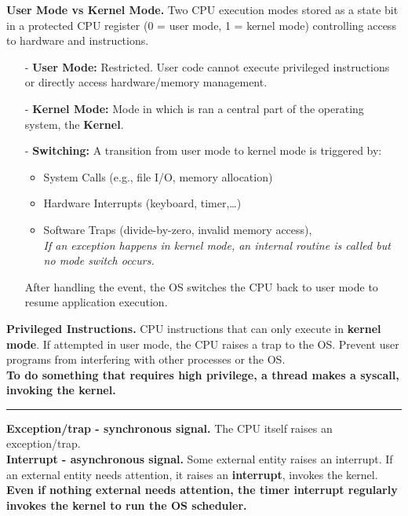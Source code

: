 \documentclass[8pt]{extarticle}
\begin{document}
\begin{minipage}[htp]{0.5\textwidth}
\begin{minipage}[htp]{1\textwidth}
\begin{itemize}[noitemsep,nolistsep,topsep=-10px,partopsep=0pt,parsep=0pt]
    \end{itemize}
    \vspace{15px}
    \noindent\textbf{User Mode vs Kernel Mode.} Two CPU execution modes stored as a state bit in a protected CPU register (0 = user mode, 1 = kernel mode) controlling access to hardware and instructions.
    \begin{itemize}[noitemsep,nolistsep,topsep=-10px,partopsep=0pt,parsep=0pt]
        \item[-] \textbf{User Mode:} Restricted. User code cannot execute privileged instructions or directly access hardware/memory management.
        \item[-] \textbf{Kernel Mode:} Mode in which is ran a central part of the operating system, the \textbf{Kernel}.
        \item[-] \textbf{Switching:} A transition from user mode to kernel mode is triggered by:
        \begin{itemize}[noitemsep,nolistsep]
            \item System Calls (e.g., file I/O, memory allocation)
            \item Hardware Interrupts (keyboard, timer,\dots)
            \item Software Traps (divide-by-zero, invalid memory access), \\
            \textit{If an exception happens in kernel mode, an internal routine is called but no mode switch occurs.}
        \end{itemize}
        After handling the event, the OS switches the CPU back to user mode to resume application execution.
    \end{itemize}\vspace{15px}
    \noindent\textbf{Privileged Instructions.} CPU instructions that can only execute in \textbf{kernel mode}. If attempted in user mode, the CPU raises a trap to the OS. Prevent user programs from interfering with other processes or the OS.\\
    \textbf{To do something that requires high privilege, a thread makes a \textbf{syscall}, invoking the kernel.} \\[-4px]
    \hrule
    \vspace{4px}
    \noindent\textbf{Exception/trap - synchronous signal.} The CPU itself raises an exception/trap. \\
    \noindent\textbf{Interrupt - asynchronous signal.} Some external entity raises an interrupt. If an external entity needs attention, it raises an \textbf{interrupt}, invokes the kernel. \\
    \noindent\textbf{Even if nothing external needs attention, the timer interrupt regularly invokes the kernel to run the \textbf{OS scheduler}.} \\[-5px]
    \end{minipage}
\end{minipage}
\end{document}
